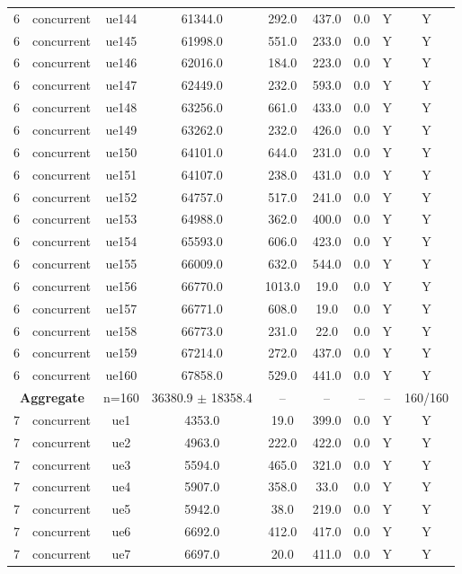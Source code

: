 \begin{table}[ht]
\begin{tabular}{|c|c|c|c|c|c|c|c|c|}
6 & concurrent & ue144 & 61344.0 & 292.0 & 437.0 & 0.0 & Y & Y \\
6 & concurrent & ue145 & 61998.0 & 551.0 & 233.0 & 0.0 & Y & Y \\
6 & concurrent & ue146 & 62016.0 & 184.0 & 223.0 & 0.0 & Y & Y \\
6 & concurrent & ue147 & 62449.0 & 232.0 & 593.0 & 0.0 & Y & Y \\
6 & concurrent & ue148 & 63256.0 & 661.0 & 433.0 & 0.0 & Y & Y \\
6 & concurrent & ue149 & 63262.0 & 232.0 & 426.0 & 0.0 & Y & Y \\
6 & concurrent & ue150 & 64101.0 & 644.0 & 231.0 & 0.0 & Y & Y \\
6 & concurrent & ue151 & 64107.0 & 238.0 & 431.0 & 0.0 & Y & Y \\
6 & concurrent & ue152 & 64757.0 & 517.0 & 241.0 & 0.0 & Y & Y \\
6 & concurrent & ue153 & 64988.0 & 362.0 & 400.0 & 0.0 & Y & Y \\
6 & concurrent & ue154 & 65593.0 & 606.0 & 423.0 & 0.0 & Y & Y \\
6 & concurrent & ue155 & 66009.0 & 632.0 & 544.0 & 0.0 & Y & Y \\
6 & concurrent & ue156 & 66770.0 & 1013.0 & 19.0 & 0.0 & Y & Y \\
6 & concurrent & ue157 & 66771.0 & 608.0 & 19.0 & 0.0 & Y & Y \\
6 & concurrent & ue158 & 66773.0 & 231.0 & 22.0 & 0.0 & Y & Y \\
6 & concurrent & ue159 & 67214.0 & 272.0 & 437.0 & 0.0 & Y & Y \\
6 & concurrent & ue160 & 67858.0 & 529.0 & 441.0 & 0.0 & Y & Y \\
\multicolumn{2}{|c|}{\textbf{Aggregate}} & n=160 & 36380.9 $\pm$ 18358.4 & -- & -- & -- & -- & 160/160 \\
\hline
7 & concurrent & ue1 & 4353.0 & 19.0 & 399.0 & 0.0 & Y & Y \\
7 & concurrent & ue2 & 4963.0 & 222.0 & 422.0 & 0.0 & Y & Y \\
7 & concurrent & ue3 & 5594.0 & 465.0 & 321.0 & 0.0 & Y & Y \\
7 & concurrent & ue4 & 5907.0 & 358.0 & 33.0 & 0.0 & Y & Y \\
7 & concurrent & ue5 & 5942.0 & 38.0 & 219.0 & 0.0 & Y & Y \\
7 & concurrent & ue6 & 6692.0 & 412.0 & 417.0 & 0.0 & Y & Y \\
7 & concurrent & ue7 & 6697.0 & 20.0 & 411.0 & 0.0 & Y & Y \\

\end{tabular}
\end{table}

